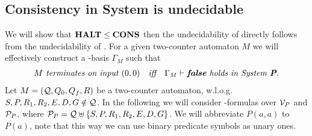 \subsection{Consistency in System \SysP{} is undecidable}
We will show that $\textbf{HALT}\leq\textbf{CONS}$ then the undecidability of \PCons{} directly follows from the undecidability of \autHalt. For a given two-counter automaton $M$ we will effectively construct a \SysP-basis $\Gamma_M$ such that
\begin{align*}
 & \textit{$M$ terminates on input $(0,0)$} &   & \textit{iff} & \textit{$\Gamma_M\vdash\textbf{false}$ holds in System \textbf{P}.} 
\end{align*}
Let $M=(\mathcal{Q},Q_0,Q_f,R)$ be a two-counter automaton, w.l.o.g. $S,P,R_1,R_2,E,D,G\notin\mathcal{Q}$. In the following we will consider \SysP-formulas over $\mathcal{V}_P$ and $\mathcal{P}_P$, where $\mathcal{P}_P=\mathcal{Q}\uplus\{S,P,R_1,R_2,E,D,G\}$. We will abbreviate $P(a,a)$ to $P(a)$, note that this way we can use binary predicate symbols as unary ones.

